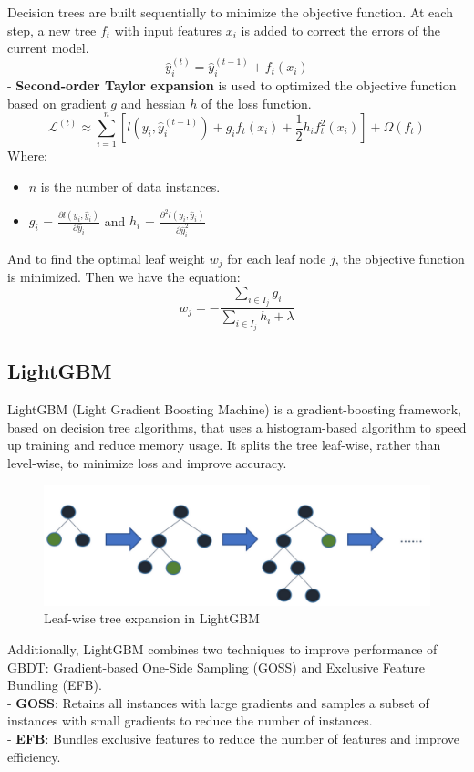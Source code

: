 \documentclass{ieeeojies}
\begin{document}
Decision trees are built sequentially to minimize the objective function. At each step, a new tree \(f_t\) with input features \(x_i\) is added to correct the errors of the current model.
\begin{dmath*}
    \hat{y}_i^{(t)} = \hat{y}_i^{(t-1)} + f_t(x_i)
\end{dmath*}
- \textbf{Second-order Taylor expansion} is used to optimized the objective function based on gradient \(g\) and hessian \(h\) of the loss function.
\begin{dmath*}
    \mathcal{L}^{(t)} \approx \sum_{i=1}^n [l(y_i, \hat{y}_i^{(t-1)}) + g_i f_t(x_i) + \frac{1}{2} h_i f_t^2(x_i)] + \Omega(f_t)
\end{dmath*}
Where:
\begin{itemize}
    \item \(n\) is the number of data instances.
    \item \(g_i\) = \(\frac{\partial l(y_i, \hat{y}_i)}{\partial \hat{y}_i}\) and \(h_i\) = \(\frac{\partial^2 l(y_i, \hat{y}_i)}{\partial \hat{y}_i^2}\)
\end{itemize}
And to find the optimal leaf weight \(w_j\) for each leaf node \(j\), the objective function is minimized. Then we have the equation:
\begin{dmath*}
    w_j = -\frac{\sum_{i \in I_j} g_i}{\sum_{i \in I_j} h_i + \lambda}
\end{dmath*}
\subsection{LightGBM}
LightGBM (Light Gradient Boosting Machine) is a gradient-boosting framework, based on decision tree algorithms, that uses a histogram-based algorithm to speed up training and reduce memory usage. It splits the tree leaf-wise, rather than level-wise, to minimize loss and improve accuracy.\\
\begin{figure}[H]
    \centering
    \includegraphics[width=0.8\linewidth]{./image/LightGBM.png}
    \caption{Leaf-wise tree expansion in LightGBM}
    \label{fig:11}
\end{figure}
\noindent
Additionally, LightGBM combines two techniques to improve performance of GBDT: Gradient-based One-Side Sampling (GOSS) and Exclusive Feature Bundling (EFB).\\
- \textbf{GOSS}: Retains all instances with large gradients and samples a subset of instances with small gradients to reduce the number of instances.\\
- \textbf{EFB}: Bundles exclusive features to reduce the number of features and improve efficiency.
\end{document}
